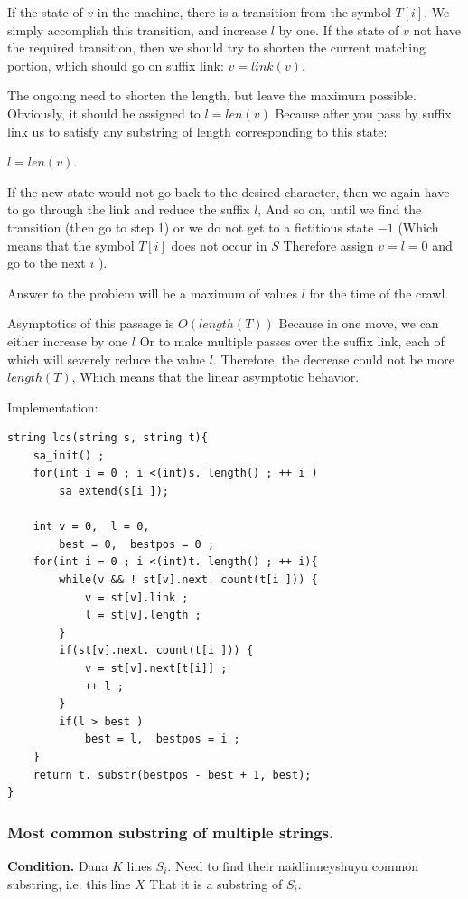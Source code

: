 If the state of $v$ in the machine, there is a transition from the symbol $T [i]$, We simply accomplish this transition, and increase $l$ by one.
If the state of $v$ not have the required transition, then we should try to shorten the current matching portion, which should go on suffix link:
$v = link (v).$

The ongoing need to shorten the length, but leave the maximum possible. Obviously, it should be assigned to $l = len (v)$ Because after you pass by suffix link us to satisfy any substring of length corresponding to this state:

$l = len (v).$

If the new state would not go back to the desired character, then we again have to go through the link and reduce the suffix $l$, And so on, until we find the transition (then go to step 1) or we do not get to a fictitious state $-1$ (Which means that the symbol $T [i]$ does not occur in $S$ Therefore assign $v = l = 0$ and go to the next $i$ ).

Answer to the problem will be a maximum of values $l$ for the time of the crawl.

Asymptotics of this passage is $O (length (T))$ Because in one move, we can either increase by one $l$ Or to make multiple passes over the suffix link, each of which will severely reduce the value $l$. Therefore, the decrease could not be more $length (T)$, Which means that the linear asymptotic behavior.

Implementation:

\begin{verbatim}
string lcs(string s, string t){
    sa_init() ;
    for(int i = 0 ; i <(int)s. length() ; ++ i )
        sa_extend(s[i ]);
 
    int v = 0,  l = 0,
        best = 0,  bestpos = 0 ;
    for(int i = 0 ; i <(int)t. length() ; ++ i){
        while(v && ! st[v].next. count(t[i ])) {
            v = st[v].link ;
            l = st[v].length ;
        }
        if(st[v].next. count(t[i ])) {
            v = st[v].next[t[i]] ;
            ++ l ;
        }
        if(l > best )
            best = l,  bestpos = i ;
    }
    return t. substr(bestpos - best + 1, best);
} 
\end{verbatim}
\subsubsection{ Most common substring of multiple strings. }

\textbf{Condition.} Dana $K$ lines $S_i$. Need to find their naidlinneyshuyu common substring, i.e. this line $X$ That it is a substring of $S_i$.

